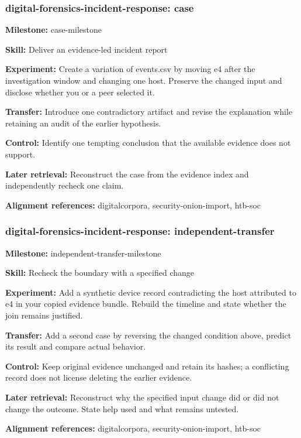 \subsubsection{digital-forensics-incident-response: case}
\noindent\textbf{Milestone:} case-milestone\par
\noindent\textbf{Skill:} Deliver an evidence-led incident report\par
\noindent\textbf{Experiment:} Create a variation of events.csv by moving e4 after the investigation window and changing one host. Preserve the changed input and disclose whether you or a peer selected it.\par
\noindent\textbf{Transfer:} Introduce one contradictory artifact and revise the explanation while retaining an audit of the earlier hypothesis.\par
\noindent\textbf{Control:} Identify one tempting conclusion that the available evidence does not support.\par
\noindent\textbf{Later retrieval:} Reconstruct the case from the evidence index and independently recheck one claim.\par
\noindent\textbf{Alignment references:} digitalcorpora, security-onion-import, htb-soc\par
\subsubsection{digital-forensics-incident-response: independent-transfer}
\noindent\textbf{Milestone:} independent-transfer-milestone\par
\noindent\textbf{Skill:} Recheck the boundary with a specified change\par
\noindent\textbf{Experiment:} Add a synthetic device record contradicting the host attributed to e4 in your copied evidence bundle. Rebuild the timeline and state whether the join remains justified.\par
\noindent\textbf{Transfer:} Add a second case by reversing the changed condition above, predict its result and compare actual behavior.\par
\noindent\textbf{Control:} Keep original evidence unchanged and retain its hashes; a conflicting record does not license deleting the earlier evidence.\par
\noindent\textbf{Later retrieval:} Reconstruct why the specified input change did or did not change the outcome. State help used and what remains untested.\par
\noindent\textbf{Alignment references:} digitalcorpora, security-onion-import, htb-soc\par
